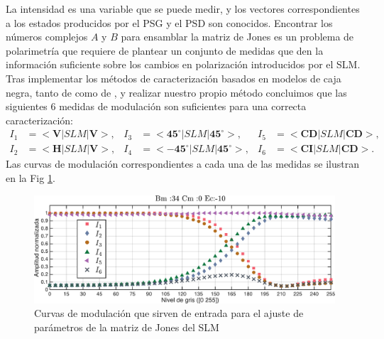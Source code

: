 La intensidad es una variable que se puede medir, y los vectores
correspondientes a los estados producidos por el PSG y el PSD son
conocidos. Encontrar los números complejos $A$ y $B$ para ensamblar la
matriz de Jones es un problema de polarimetría que requiere de
plantear un conjunto de medidas que den la información suficiente
sobre los cambios en polarización introducidos por el SLM. 
Tras implementar los métodos de caracterización basados en modelos de
caja negra, tanto de  como de
, y realizar nuestro propio método concluimos que
las siguientes 6 medidas de modulación son suficientes para una
correcta caracterización:
\begin{align*}
I_1 &= <\mathbf{V}|SLM|\mathbf{V}>,& I_3 &=
                                          <\mathbf{45^{\circ}}|SLM|\mathbf{45^{\circ}}>,&I_5
  &= <\mathbf{CD}|SLM|\mathbf{CD}>,\\
I_2 &= <\mathbf{H}|SLM|\mathbf{V}>,&I_4 &=
                                         <\mathbf{-45^{\circ}}|SLM|\mathbf{45^{\circ}}>,&I_{6}
  &= <\mathbf{CI}|SLM|\mathbf{CD}>.
\end{align*}
Las curvas de modulación correspondientes a cada una de las medidas se
ilustran en la Fig \ref{fig:six_input_measures}. 
\begin{figure}[h!]
\centering
\includegraphics[scale=.55]{six_input_measures.pdf}
\caption[Curvas de modulación que sirven de entrada para el ajuste de
parámetros de la matriz de Jones del SLM]{Curvas de modulación que sirven de entrada para el ajuste de
parámetros de la matriz de Jones del SLM}
\label{fig:six_input_measures}
\end{figure}
